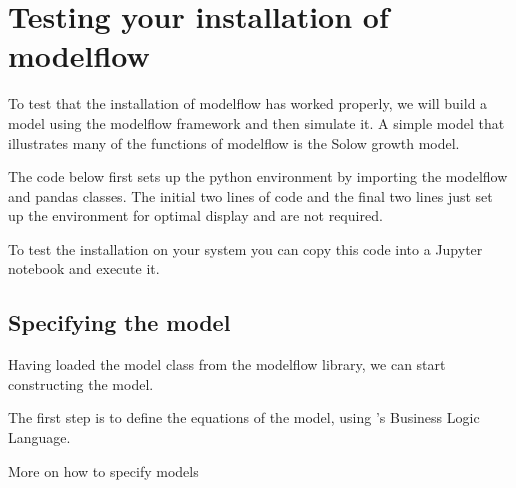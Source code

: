 \documentclass[letterpaper,10pt,english]{jupyterBook}
\begin{document}
\sphinxstepscope


\chapter{Testing your installation of modelflow}
\label{\detokenize{content/03_Installation/TestingModelFlow:testing-your-installation-of-modelflow}}\label{\detokenize{content/03_Installation/TestingModelFlow::doc}}
\sphinxAtStartPar
To test that the installation of modelflow has worked properly, we will build a model using the modelflow framework and then simulate it.  A simple model that illustrates many of the functions of modelflow is the Solow growth model.

\sphinxAtStartPar
The code below first sets up the python environment by importing the modelflow  and pandas classes.  The initial two lines of code and the final two lines just set up the environment for optimal display and are not required.

\sphinxAtStartPar
To test the installation on your system you can copy this code into a Jupyter notebook and execute it.


\section{Specifying the model}
\label{\detokenize{content/03_Installation/TestingModelFlow:specifying-the-model}}
\sphinxAtStartPar
Having loaded the model class from the modelflow library, we can start constructing the model.

\sphinxAtStartPar
The first step is to define the equations of the model, using ’s Business Logic Language.

\begin{sphinxShadowBox}

\sphinxAtStartPar
More on how to specify models 
\end{sphinxShadowBox}
\end{document}
